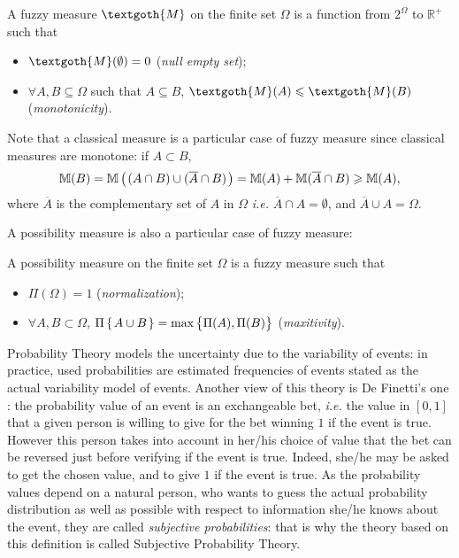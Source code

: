 \begin{Def}
\label{fuzzy_measure}
A fuzzy measure $\textgoth{M}$ on the finite set $\Omega$ is a function from $2^{\Omega}$ to $\mathbb{R}^{+}$ such that
\begin{itemize}
\item $\textgoth{M}(\emptyset) = 0$ (\textit{null empty set});
\item $\forall A,B \subseteq \Omega$ such that $A \subseteq B$, $\textgoth{M}(A) \leqslant \textgoth{M}(B)$ (\textit{monotonicity}).
\end{itemize}
\end{Def}
Note that a classical measure is a particular case of fuzzy measure
since classical measures are monotone: 
if $A \subset B$, 
\[ \mathbb{M}(B) = \mathbb{M} \left( \left.  (A \cap B) \cup (\overline{A} \cap B)  \right. \right) = \mathbb{M}( A ) + \mathbb{M} (\overline{A} \cap B) \geqslant  \mathbb{M}( A ), \]
where $\overline{A}$ is the complementary set of $A$ in $\Omega$ \textit{i.e.} $\overline{A} \cap A = \emptyset$, and $\overline{A} \cup A = \Omega$.

A possibility measure is also a particular case of fuzzy measure:
\begin{Def}
\label{poss_measure}
A possibility measure on the finite set $\Omega$ is a fuzzy measure such that
\begin{itemize}
\item $\Pi(\Omega) = 1$ (\textit{normalization});
\item $\forall A,B \subset \Omega$, $\Pi \left\{ \left.  A \cup B  \right. \right\} = \max \big\{ \Pi(A), \Pi(B) \big\}$ (\textit{maxitivity}).
\end{itemize}
\end{Def}

Probability Theory models the uncertainty due to the variability of events:
in practice, used probabilities are estimated frequencies of events
stated as the actual variability model of events. 
Another view of this theory is De Finetti's one \cite{de1974theory}:
the probability value of an event is an exchangeable bet, \textit{i.e.}
the value in $[0,1]$ that a given person is willing to give
for the bet winning $1$ if the event is true.
However this person takes into account in her/his choice of value
that the bet can be reversed just before verifying if the event is true.
Indeed, she/he may be asked to get the chosen value,
and to give $1$ if the event is true.
As the probability values depend on a natural person,
who wants to guess the actual probability distribution 
as well as possible with respect to information she/he knows about the event,
they are called \textit{subjective probabilities}:
that is why the theory based on this definition is called
Subjective Probability Theory.

